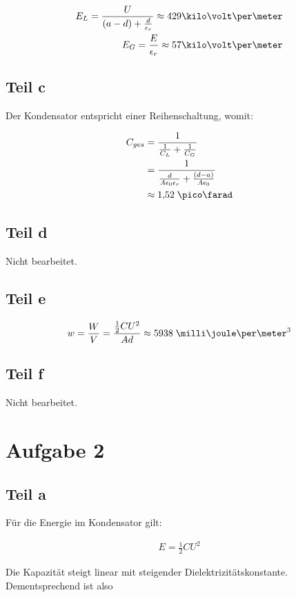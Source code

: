 \documentclass[a4paper,german,12pt,smallheadings]{scrartcl}
\begin{document}
\begin{align*}
  E_L = \frac{U}{(a-d) + \frac{d}{\epsilon_r}} \approx 429 \kilo\volt\per\meter \\
  E_G = \frac{E}{\epsilon_r} \approx 57 \kilo\volt\per\meter
\end{align*}

\subsection*{Teil c}
Der Kondensator entspricht einer Reihenschaltung, womit:

\begin{align*}
  C_{ges} &= \frac{1}{\frac{1}{C_L} + \frac{1}{C_G}} \\
  &= \frac{1}{\frac{d}{A\epsilon_0 \epsilon_r} + \frac{(d-a)}{A\epsilon_0}} \\
  &\approx 1{,}52\;\pico\farad
\end{align*}

\subsection*{Teil d}
Nicht bearbeitet.

\subsection*{Teil e}
\begin{align*}
  w = \frac{W}{V} = \frac{\frac{1}{2} C U^2}{Ad} \approx 5938\;\milli\joule\per\meter^3
\end{align*}

\subsection*{Teil f}
Nicht bearbeitet.


\section*{Aufgabe 2}
\subsection*{Teil a}

Für die Energie im Kondensator gilt:

\begin{align*}
  E = \frac{1}{2} C U^2
\end{align*}

Die Kapazität steigt linear mit steigender Dielektrizitätskonstante. Dementsprechend ist also
\end{document}
